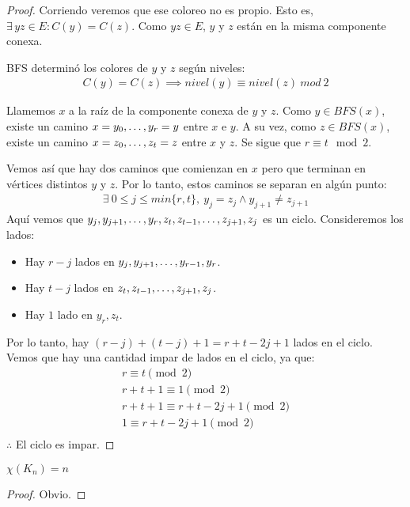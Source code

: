 \begin{proof}
Corriendo  veremos que ese coloreo no es propio. Esto es, $\exists\, yz \in E : C(y) = C(z)$. Como $yz \in E$, $y$ y $z$ están en la misma componente conexa.

BFS determinó los colores de $y$ y $z$ según niveles:
\begin{align}
    C(y) = C(z) \implies nivel(y) \equiv nivel(z)\ mod\ 2
\end{align}

Llamemos $x$ a la raíz de la componente conexa de $y$ y $z$. Como $y \in BFS(x)$, existe un camino $x = y_0, \mathellipsis, y_r = y$ entre $x$ e $y$. A su vez, como $z \in BFS(x)$, existe un camino $x = z_0, \mathellipsis, z_t = z$ entre $x$ y $z$. Se sigue que $r \equiv t \mod{2}$.

Vemos así que hay dos caminos que comienzan en $x$ pero que terminan en vértices distintos $y$ y $z$. Por lo tanto, estos caminos se separan en algún punto:
\begin{align}
    \exists~0 \le j \le min\{r,t\},~y_j = z_j \wedge y_{j+1} \neq z_{j+1}
\end{align}
Aquí vemos que $y_j, y_{j+1}, \mathellipsis, y_r, z_t, z_{t-1}, \mathellipsis, z_{j+1}, z_{j}$ es un ciclo.
Consideremos los lados:

\begin{itemize}
    \item Hay $r-j$ lados en $y_j, y_{j+1}, \mathellipsis, y_{r-1}, y_r$.
    \item Hay $t-j$ lados en $z_t, z_{t-1}, \mathellipsis, z_{j+1}, z_j$.
    \item Hay $1$ lado en $y_r,z_t$.
\end{itemize}

Por lo tanto, hay $(r-j)+(t-j)+1 = r+t-2j+1$ lados en el ciclo. Vemos que hay una cantidad impar de lados en el ciclo, ya que:
\begin{align}
    r \equiv t \pmod{2}\\
    r + t + 1 \equiv 1 \pmod{2}\\
    r + t + 1 \equiv r + t - 2j + 1 \pmod 2\\
    1 \equiv r + t - 2j + 1 \pmod 2\\
\end{align}
$\therefore$ El ciclo es impar.
\end{proof}

\begin{proposition}\label{chi_es_completo}
$\chi(K_{n}) = n$
\end{proposition}
\begin{proof}
Obvio.
\end{proof}

